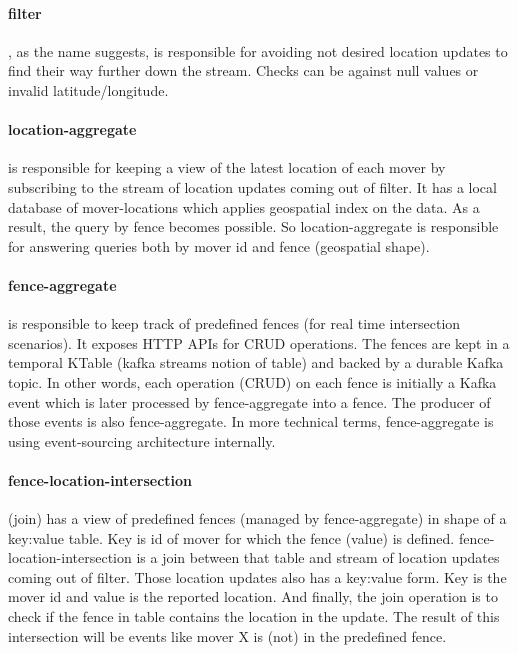 \documentclass[a4]{report}
\begin{document}
    \paragraph{filter}, as the name suggests, is responsible for avoiding not desired location updates to find their
    way further down the stream.
    Checks can be against null values or invalid latitude/longitude.

    \paragraph{location-aggregate} is responsible for keeping a view of the latest location of each mover by
    subscribing to the stream of location updates coming out of filter.
    It has a local database of mover-locations which applies geospatial index on the data.
    As a result, the query by fence becomes possible.
    So location-aggregate is responsible for answering queries both by mover id and fence (geospatial shape).

    \paragraph{fence-aggregate} is responsible to keep track of predefined fences (for real time intersection scenarios).
    It exposes HTTP APIs for CRUD operations.
    The fences are kept in a temporal KTable (kafka streams notion of table) and backed by a durable Kafka topic.
    In other words, each operation (CRUD) on each fence is initially a Kafka event which is later processed by
    fence-aggregate into a fence.
    The producer of those events is also fence-aggregate.
    In more technical terms, fence-aggregate is using event-sourcing architecture internally.

    \paragraph{fence-location-intersection} (join) has a view of predefined fences (managed by fence-aggregate) in
    shape of a key:value table.
    Key is id of mover for which the fence (value) is defined.
    fence-location-intersection is a join between that table and stream of location updates coming out of filter.
    Those location updates also has a key:value form.
    Key is the mover id and value is the reported location.
    And finally, the join operation is to check if the fence in table contains the location in the update.
    The result of this intersection will be events like mover X is (not) in the predefined fence.
\end{document}
